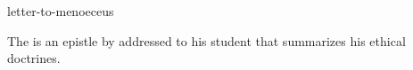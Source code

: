 \documentclass{stex}
\begin{document}
\begin{smodule}{letter-to-menoeceus}
\begin{sparagraph}[style=symdoc]
The  is an epistle by  addressed to
his student  that summarizes his ethical doctrines.
\end{sparagraph}
\end{smodule}
\end{document}

